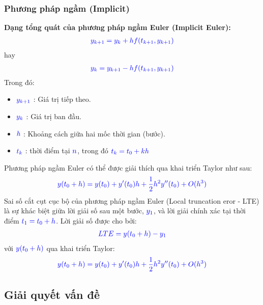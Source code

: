\documentclass[a4paper]{article}
\begin{document}
    \subsubsection{Phương pháp ngầm (Implicit)}
    {\bfseries  Dạng tổng quát của phương pháp ngầm Euler (Implicit Euler):}
    \begin{align} \notag
         \textcolor{blue}{y_{k+1} = y_{k} + hf(t_{k+1}, y_{k+1})} 
    \end{align}
    hay
    \begin{align}
        \textcolor{blue}{y_{k} = y_{k+1} - hf(t_{k+1}, y_{k+1})}
    \end{align}
    Trong đó:
        \begin{itemize}
        \item $\textcolor{blue}{y_{k+1}}$ : Giá trị tiếp theo.
        \item $\textcolor{blue}{y_{k}}$ : Giá trị ban đầu. 
        \item $\textcolor{blue}{h}$ : Khoảng cách giữa hai mốc thời gian (bước).
        \item $\textcolor{blue}{t_{k}}$ : thời điểm tại $\textcolor{blue}{n}$, trong đó $\textcolor{blue}{t_{k} = t_{0} + kh}$
    \end{itemize}
    Phương pháp ngầm Euler có thể được giải thích qua khai triển Taylor như sau:
    \begin{align} \notag
        \textcolor{blue}{y(t_{0} + h) = y(t_{0}) + y'(t_0)h + \dfrac{1}{2}h^{2}y''(t_{0}) + O(h^3)}
    \end{align}
    Sai số cắt cụt cục bộ của phương pháp ngầm Euler (Local truncation eror - LTE) là sự khác biệt giữa lời giải số sau một bước, $\textcolor{blue}{y_1}$, và lời giải chính xác tại thời điểm $\textcolor{blue}{t_1 = t_0 + h}$.
    Lời giải số được cho bởi:
    \begin{align} \notag
        \textcolor{blue}{LTE = y(t_0 + h) - y_1}
    \end{align}
    với $\textcolor{blue}{y(t_{0} + h)}$ qua khai triển Taylor: 
	\begin{align} \notag
        \textcolor{blue}{y(t_{0} + h) = y(t_{0}) + y'(t_0)h + \dfrac{1}{2}h^{2}y''(t_{0}) + O(h^3)}
    \end{align}
	\subsection{Giải quyết vấn đề}
\end{document}
